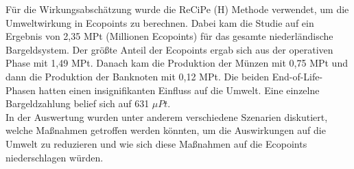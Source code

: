 \FloatBarrier
\noindent Für die Wirkungsabschätzung wurde die ReCiPe (H) Methode verwendet, um die Umweltwirkung in Ecopoints zu berechnen. Dabei kam die Studie auf ein Ergebnis von 2,35 MPt (Millionen Ecopoints) für das gesamte niederländische Bargeldsystem. Der größte Anteil der Ecopoints ergab sich aus der operativen Phase mit 1,49 MPt. Danach kam die Produktion der Münzen mit 0,75 MPt und dann die Produktion der Banknoten mit 0,12 MPt. Die beiden End-of-Life-Phasen hatten einen insignifikanten Einfluss auf die Umwelt. Eine einzelne Bargeldzahlung belief sich auf 631 \begin{math}\mu Pt\end{math}.\\
In der Auswertung wurden unter anderem verschiedene Szenarien diskutiert, welche Maßnahmen getroffen werden könnten, um die Auswirkungen auf die Umwelt zu reduzieren und wie sich diese Maßnahmen auf die Ecopoints niederschlagen würden.